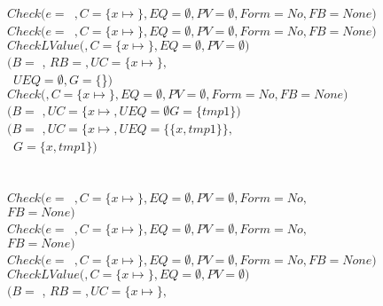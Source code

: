 \begin{small}
\begin{tabbing}
\>\>$Check(e=$~$, C=\{x \mapsto$$\},
         EQ=\emptyset,PV=\emptyset, Form = No, FB = None)$\\
\>\>\>$Check(e=$~$, C=\{x \mapsto$$\},
          EQ=\emptyset,PV=\emptyset, Form = No, FB = None)$\\
\>\>\>\>$CheckLValue($$, C = \{x \mapsto$$\}, EQ = \emptyset, PV = \emptyset)$ \\
\>\>\>\>\>$(B = $ , $RB = $$,
                     UC = \{x \mapsto$$\},$\\
\>\>\>\>\>~$UEQ = \emptyset, G = \{$\}$)$ \\
\>\>\>$Check($$,C  =\{x\mapsto$$\}, EQ = \emptyset, PV = \emptyset,
                       Form = No, FB = None)$\\
\>\>\>\>$(B = $ $, UC = \{x\mapsto$$,
                UEQ = \emptyset G = \{tmp1\})$\\
\>\>\>$(B = $ $, UC = \{x\mapsto$$ ,
             UEQ = \{\{x, tmp1\}\},$\\
\>\>\>~$G = \{x, tmp1\})$\\ \\
\>\\
\>\>$Check(e=$~$, C=\{x \mapsto$$\},
         EQ=\emptyset,PV=\emptyset, Form = No,$\\
\>\>\>\>\>$FB = None)$\\
\>\>\>$Check(e=$~$, C=\{x \mapsto$$\},
          EQ=\emptyset,PV=\emptyset, Form = No,$\\
\>\>\>\>\>\>$FB = None)$\\
\>\>\>\>$Check(e=$~$, C=\{x \mapsto$$\},
          EQ=\emptyset,PV=\emptyset, Form = No, FB = None)$\\
\>\>\>\>\>$CheckLValue($$, C = \{x \mapsto$$\}, EQ =  \emptyset,
                   PV = \emptyset)$ \\
\>\>\>\>\>\>$(B = $ , $RB = $$,
                     UC = \{x \mapsto$$\},$\\

\end{tabbing}
\end{small}
